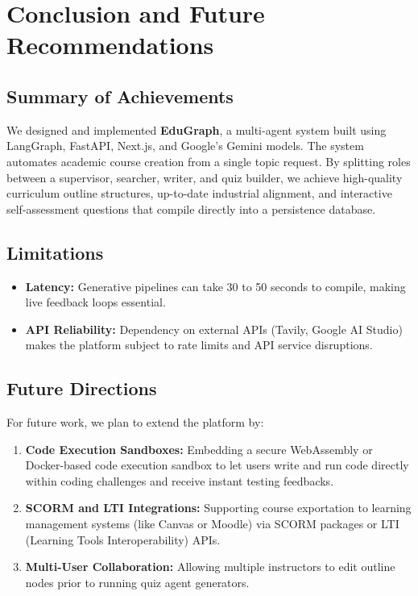 \documentclass[12pt,a4paper]{report}
\begin{document}
\chapter{Conclusion and Future Recommendations}
\label{ch:conclusion}

\section{Summary of Achievements}
We designed and implemented \textbf{EduGraph}, a multi-agent system built using LangGraph, FastAPI, Next.js, and Google's Gemini models. The system automates academic course creation from a single topic request. By splitting roles between a supervisor, searcher, writer, and quiz builder, we achieve high-quality curriculum outline structures, up-to-date industrial alignment, and interactive self-assessment questions that compile directly into a persistence database.

\section{Limitations}
\begin{itemize}
    \item \textbf{Latency:} Generative pipelines can take 30 to 50 seconds to compile, making live feedback loops essential.
    \item \textbf{API Reliability:} Dependency on external APIs (Tavily, Google AI Studio) makes the platform subject to rate limits and API service disruptions.
\end{itemize}

\section{Future Directions}
For future work, we plan to extend the platform by:
\begin{enumerate}
    \item \textbf{Code Execution Sandboxes:} Embedding a secure WebAssembly or Docker-based code execution sandbox to let users write and run code directly within coding challenges and receive instant testing feedbacks.
    \item \textbf{SCORM and LTI Integrations:} Supporting course exportation to learning management systems (like Canvas or Moodle) via SCORM packages or LTI (Learning Tools Interoperability) APIs.
    \item \textbf{Multi-User Collaboration:} Allowing multiple instructors to edit outline nodes prior to running quiz agent generators.
\end{enumerate}



\end{document}
